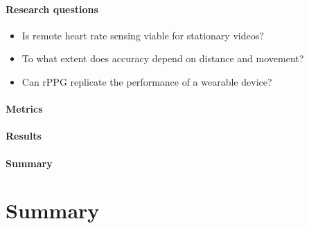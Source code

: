 \paragraph{Research questions}
\begin{itemize}
    \item Is remote heart rate sensing viable for stationary videos?
    \item To what extent does accuracy depend on distance and movement?
    \item Can rPPG replicate the performance of a wearable device?
\end{itemize}
\paragraph{Metrics}
\paragraph{Results}

\paragraph{Summary}


\section{Summary}